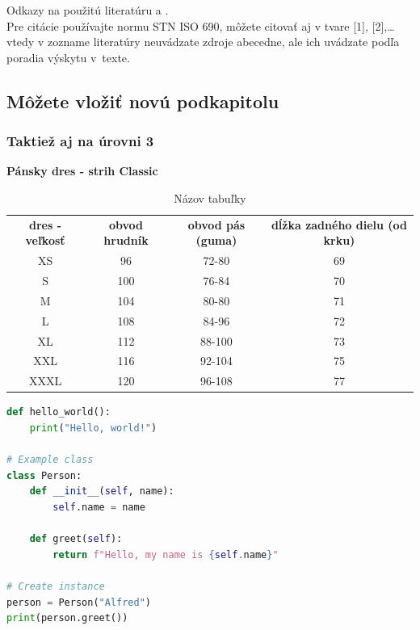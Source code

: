 \newpage
\noindent
Odkazy na použitú literatúru \textcite{borgman2003from} a \parencite{luptak2016thesis}.
\\Pre citácie používajte normu STN ISO 690, môžete citovať aj v tvare [1], [2],… vtedy v zozname literatúry neuvádzate zdroje abecedne, ale ich uvádzate podľa poradia výskytu v texte. 

\subsection{Môžete vložiť novú podkapitolu}
\subsubsection{Taktiež aj na úrovni 3}

\begin{table}[!h]
    \centering
    \caption{Názov tabuľky}
    {\color{red} \textbf{Pánsky dres - strih Classic}}\\
    \vspace{1em}
    \begin{tabular}{cccc}  
        \textbf{dres - veľkosť} & \textbf{obvod hrudník} & \textbf{obvod pás (guma)} & \textbf{dĺžka zadného dielu (od krku)} \\
        XS & 96 & 72-80 & 69 \\
        S & 100 & 76-84 & 70 \\
        M & 104 & 80-80 & 71 \\
        L & 108 & 84-96 & 72 \\
        XL & 112 & 88-100 & 73 \\
        XXL & 116 & 92-104 & 75 \\
        XXXL & 120 & 96-108 & 77 \\
    \end{tabular}
    \label{tab:example}
\end{table}

\begin{lstlisting}[language=Python, caption={Príklad kódu v Pythone}, label={lst:python-example}]    
def hello_world():
    print("Hello, world!")
        
# Example class
class Person:
    def __init__(self, name):
        self.name = name
    
    def greet(self):
        return f"Hello, my name is {self.name}"

# Create instance
person = Person("Alfred")
print(person.greet())
\end{lstlisting}